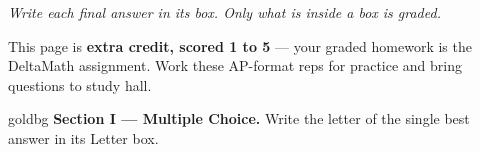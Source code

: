 \documentclass[12pt]{article}
\begin{document}
{\small\itshape Write each final answer in its box. Only what is inside a box is graded.}\par

\vspace{0.06in}

\boxguard[8]
\begin{remindbox}
\small
This page is \textbf{extra credit, scored 1 to 5} --- your graded homework is the DeltaMath
assignment. Work these AP-format reps for practice and bring questions to study hall.
\end{remindbox}

\vspace{0.06in}

\boxguard[10]
\begin{headlinebox}{goldbg}
\small
\textbf{Section I --- Multiple Choice.} Write the letter of the single best answer in its Letter box.
\end{headlinebox}

\vspace{0.06in}
\end{document}
